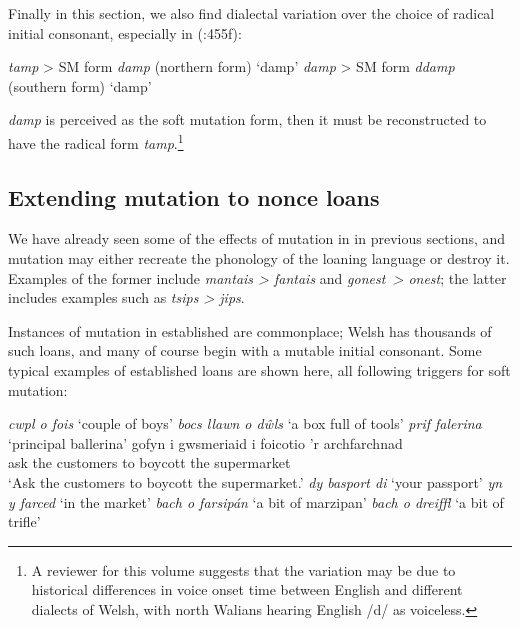 \documentclass[output=paper,colorlinks,citecolor=brown]{langscibook}
\begin{document}
Finally in this section, we also find dialectal variation over the choice of radical initial consonant, especially in  (\citealt{Morgan1952}:455f): 

\ea
\ea
{\textit{tamp}}{ > SM form} {\textit{damp} }{(northern form)   ‘damp’}
\ex
{\textit{damp} }{> SM form} {\textit{ddamp} }{(southern form)   ‘damp’}
\z
\z

 {\textit{damp}}{ is perceived as the soft mutation form, then it must be reconstructed to have the radical form} {\textit{tamp}}{.}\footnote{{A reviewer for this volume suggests that the variation may be due to historical differences in voice onset time between English and different dialects of Welsh, with north Walians hearing English /d/ as voiceless.}}


\subsection{Extending mutation to nonce loans}

{We have already seen some of the effects of mutation in  in previous sections, and mutation may either recreate the phonology of the loaning language or destroy it. Examples of the former include} {\textit{mantais > fantais}}{ and} {\textit{gonest~> onest}}{; the latter includes examples such as} {\textit{tsips > jips}}{.} 


Instances of mutation in established  are commonplace; Welsh has thousands of such loans, and many of course begin with a mutable initial consonant. Some typical examples of established loans are shown here, all following triggers for soft mutation:

\ea\label{ex:mt:tallerman:41}
\ea
\settowidth{}
\textit{cwpl o fois} ‘couple of boys’  
\ex
\textit{bocs llawn o d\^wls}  ‘a box full of tools’ 
\ex 
\textit{prif falerina} ‘principal ballerina’  
\ex
\gll gofyn i gwsmeriaid i foicotio {}'r archfarchnad \\
ask the customers to boycott the supermarket\\ 
\glt ‘Ask the customers to boycott the supermarket.’
\ex
\textit{dy basport di} ‘your passport’ 
\ex
\textit{yn y farced} ‘in the market’ 
\ex
\textit{bach o farsipán} ‘a bit of marzipan’ 
\ex
\textit{bach o dreiffl} ‘a bit of trifle’ 
\z
\z
\end{document}
